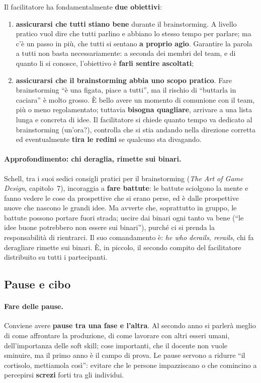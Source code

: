 Il facilitatore ha fondamentalmente \textbf{due obiettivi}:
\begin{enumerate}
  \item \textbf{assicurarsi che tutti stiano bene} durante il brainstorming.
        A livello pratico vuol dire che tutti parlino e abbiano lo stesso
        tempo per parlare; ma c'è un passo in più, che tutti si sentano
        \textbf{a proprio agio}. Garantire la parola a tutti non basta
        necessariamente: a seconda dei membri del team, e di quanto li si
        conosce, l'obiettivo è \textbf{farli sentire ascoltati};
  \item \textbf{assicurarsi che il brainstorming abbia uno scopo pratico}.
        Fare brainstorming ``è una figata, piace a tutti'', ma il rischio
        di ``buttarla in caciara'' è molto grosso. È bello avere un momento
        di comunione con il team, più o meno regolamentato; tuttavia
        \textbf{bisogna quagliare}, arrivare a una lista lunga e concreta di
        idee. Il facilitatore si chiede quanto tempo va dedicato al
        brainstorming (un'ora?), controlla che si stia andando nella
        direzione corretta ed eventualmente \textbf{tira le redini} se
        qualcuno sta divagando.
\end{enumerate}

\paragraph{Approfondimento: chi deraglia, rimette sui binari.} Schell, tra i
suoi sedici consigli pratici per il brainstorming (\emph{The Art of Game
Design}, capitolo~7), incoraggia a \textbf{fare battute}: le battute
sciolgono la mente e fanno vedere le cose da prospettive che si erano perse,
ed è dalle prospettive nuove che nascono le grandi idee. Ma avverte che,
soprattutto in gruppo, le battute possono portare fuori strada; uscire dai
binari ogni tanto va bene (``le idee buone potrebbero non essere sui
binari''), purché ci si prenda la responsabilità di rientrarci. Il suo
comandamento è: \emph{he who derails, rerails}, chi fa deragliare rimette sui
binari. È, in piccolo, il secondo compito del facilitatore distribuito su
tutti i partecipanti.

\subsection{Pause e cibo}

\paragraph{Fare delle pause.} Conviene avere \textbf{pause tra una fase e
l'altra}. Al secondo anno si parlerà meglio di come affrontare la produzione,
di come lavorare con altri esseri umani, dell'importanza delle soft skill;
cose importanti, che il docente non vuole sminuire, ma il primo anno è il
campo di prova. Le pause servono a ridurre ``il cortisolo, mettiamola
così'': evitare che le persone impazziscano o che comincino a percepirsi
\textbf{screzi} forti tra gli individui.


